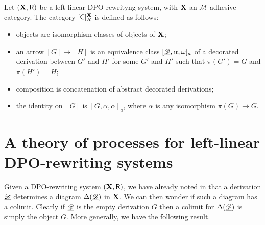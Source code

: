 \begin{definition}
	Let $(\textbf {\textup{X}}, \mathsf{R})$ be a left-linear DPO-rewrityng system, with $\textbf {\textup{X}}$ an $\mathcal{M}$-adhesive category. The  category $[\mathsf{C}]^{\textbf {\textup{X}}}_R$ is defined as follows:
	\begin{itemize}
		\item objects are isomorphism classes of objects of $\textbf {\textup{X}}$;
		\item an arrow $[G]\to [H]$ is an equivalence class $[\underline{\mathscr{D}}, \alpha, \omega]_a$ of a decorated derivation between $G'$ and $H'$ for some $G'$ and $H'$ such that $\pi(G')=G$ and $\pi(H')=H$;
		\item composition is concatenation of abstract decorated derivations;
		\item the identity on $[G]$ is $[G, \alpha, \alpha]_a$, where $\alpha$ is any isomorphism $\pi(G)\to G$.	\end{itemize}
\end{definition}



\section{A theory of processes for left-linear DPO-rewriting systems} 

Given a DPO-rewriting system $(\textbf {\textup{X}}, \mathsf{R})$,  we have already noted in  that a derivation $\underline{\mathscr{D}}$  determines a diagram $\Delta(\underline{\mathscr{D}})$ in $\textbf {\textup{X}}$. We can then wonder if such a diagram has a colimit. Clearly if $\underline{\mathscr{D}}$ is the empty derivation $G$ then a colimit for $\Delta(\underline{\mathscr{D}})$ is simply the object $G$. More generally, we have the following result.

